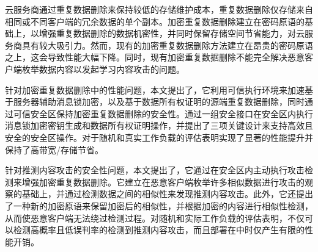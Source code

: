 \begin{chineseabstract}
    云服务商通过重复数据删除来保持较低的存储维护成本，重复数据删除仅存储来自相同或不同客户端的冗余数据的单个副本。加密重复数据删除建立在密码原语的基础上，以增强重复数据删除的数据机密性，并同时保留存储空间节省能力，对云服务商具有较大吸引力。然而，现有的加密重复数据删除方法建立在昂贵的密码原语之上，这会导致性能大幅下降。同时，现有加密重复数据删除不能完全解决恶意客户端枚举数据内容以发起学习内容攻击的问题。
    
    针对加密重复数据删除中的性能问题，本文提出了\sysnameS，它利用可信执行环境来加速基于服务器辅助消息锁加密，以及基于数据所有权证明的源端重复数据删除，同时通过可信安全区保持加密重复数据删除的安全性。\sysnameS 通过一组安全接口在安全区内执行消息锁加密密钥生成和数据所有权证明操作，并提出了三项关键设计来支持高效且安全的安全区操作。对于随机和真实工作负载的评估表明\sysnameS 实现了显著的性能提升并保持了高带宽/存储节省。
    
    针对推测内容攻击的安全性问题，本文提出了\sysnameF，它通过在安全区内主动执行攻击检测来增强加密重复数据删除。它建立在恶意客户端枚举许多相似数据进行攻击的观察的基础上，并通过检测数据之间的相似性来发现推测内容攻击。此外，它还提出了一种新的加密原语来保留加密后的相似性，并根据加密的内容进行相似性检测，从而使恶意客户端无法绕过检测过程。对随机和实际工作负载的评估表明，\sysnameF 不仅可以检测高概率且低误判率的检测到推测内容攻击，而且部署在\sysnameS 中时仅产生有限的性能开销。

\end{chineseabstract}

